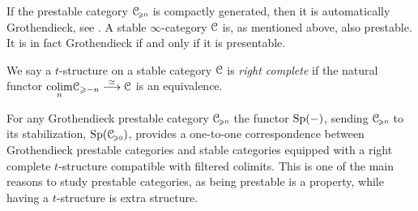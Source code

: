 

\begin{remark}
    \label{ch3:rm:stable-is-grothendieck-prestable}
    If the prestable category $\EuScript{C}_{\hspace{-1pt}\scriptscriptstyle\geqslant 0}$ is compactly generated, then it is automatically Grothendieck, see \cite[C.1.4.4]{lurie_SAG}. A stable $\infty$-category $\EuScript{C}$ is, as mentioned above, also prestable. It is in fact Grothendieck if and only if it is presentable. 
\end{remark}

\begin{definition}
    We say a $t$-structure on a stable category $\EuScript{C}$ is \emph{right complete} if the natural functor $\displaystyle {\underset{n}{\operatorname{colim}}} \EuScript{C}_{\geqslant -n} \overset{\simeq}{\longrightarrow} \EuScript{C} $ is an equivalence. 
\end{definition}

\begin{remark}
    \label{ch3:rm:grothendieck-iff-right-complete-and-colims}
    For any Grothendieck prestable category $\EuScript{C}_{\hspace{-1pt}\scriptscriptstyle\geqslant 0}$ the functor $\mathrm{Sp}(-)$, sending $\EuScript{C}_{\hspace{-1pt}\scriptscriptstyle\geqslant 0}$ to its stabilization, $\mathrm{Sp}(\EuScript{C}_{\hspace{-1pt}\scriptscriptstyle\geqslant 0})$, provides a one-to-one correspondence between Grothendieck prestable categories and stable categories equipped with a right complete $t$-structure compatible with filtered colimits. This is one of the main reasons to study prestable categories, as being prestable is a property, while having a $t$-structure is extra structure. 
\end{remark}

